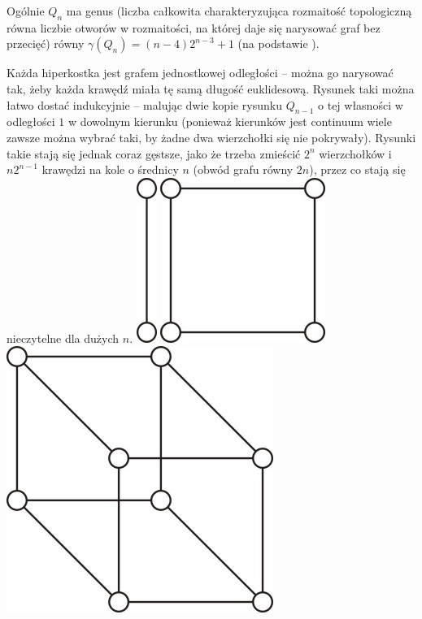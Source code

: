 \documentclass{pracamgr}
\begin{document}
   Ogólnie $Q_n$ ma genus (liczba całkowita charakteryzująca rozmaitość topologiczną równa liczbie otworów w rozmaitości, na której daje się narysować graf bez przecięć)\newline
   równy ${\gamma(Q_n)=(n-4)2^{n-3}+1}$ (na podstawie \cite{HHH}).\newline
   
   Każda hiperkostka jest grafem jednostkowej odległości -- można go narysować tak, żeby każda krawędź miała tę samą długość euklidesową.
   Rysunek taki można łatwo dostać indukcyjnie -- malując dwie kopie rysunku $Q_{n-1}$ o tej własności w odległości $1$ w dowolnym kierunku
   (ponieważ kierunków jest continuum wiele zawsze można wybrać taki, by żadne dwa wierzchołki się nie pokrywały).
   Rysunki takie stają się jednak coraz gęstsze, jako że  trzeba zmieścić $2^n$ wierzchołków i $n2^{n-1}$ krawędzi na kole o średnicy $n$
   (obwód grafu równy $2n$), przez co stają się nieczytelne dla dużych $n$.\newline
   \includegraphics[scale=1]{img/unitary_1.jpg}
   \includegraphics[scale=1]{img/unitary_2.jpg}
   \includegraphics[scale=1]{img/unitary_3.jpg}
\end{document}
